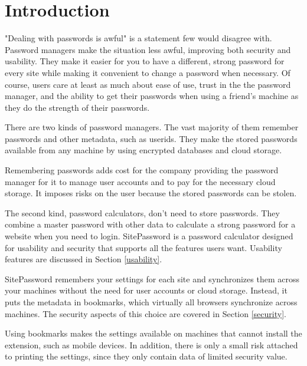 \section{Introduction}\label{intro}

"Dealing with passwords is awful" is a statement few would disagree
with.  Password managers make the situation less awful, improving both
security and usability.  They make it easier for you to have a different, strong
password for every site while making it convenient to change a password
when necessary.  Of course, users care at least as much about ease of use, trust in the
the password manager, and the ability to get their passwords when 
using a friend's machine as they do the strength of their passwords.

There are two kinds of password managers.  The vast majority of them 
remember passwords and other metadata, such as userids.   They 
make the stored passwords available from any machine by using 
encrypted databases and cloud storage.

Remembering passwords adds cost for the company providing the 
password manager for it to manage user accounts and to pay for the 
necessary cloud storage.  It imposes risks on the user because the
stored passwords can be stolen.

The second kind, password calculators, don't need to store passwords.  They combine a
master password with other data to calculate a strong password
for a website when you need to login.  SitePassword is a
password calculator designed for usability and security that supports all
the features users want.  Usability features are discussed in Section \ref{usability}.

SitePassword remembers your settings for each site and synchronizes them
across your machines without the need for user accounts or cloud storage.
Instead, it puts the metadata in bookmarks, which virtually all browsers
synchronize across machines.  The security aspects of this choice are covered
in Section \ref{security}.  

Using bookmarks makes the settings available on
machines that cannot install the extension, such as mobile devices.  In addition,
there is only a small risk attached to printing the settings, since they only contain
data of limited security value.

